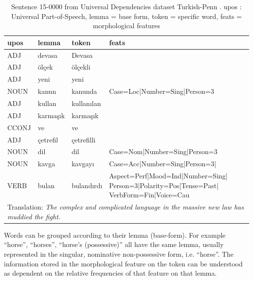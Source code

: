 \documentclass[USenglish]{article}
\begin{document}
\begin{table}[h]
    \centering
    \caption{Sentence 15-0000 from Universal Dependencies dataset Turkish-Penn \citep{kuzgun_2020_UD_turkish_penn}. upos : Universal Part-of-Speech, lemma = base form, token = specific word, feats = morphological features} %
    \label{tab:turkish_example}   
    \begin{tabular}{p{1.5cm}p{2cm}p{2cm}p{6cm}}
\toprule
	\textbf{upos}	&	\textbf{lemma}	&	\textbf{token}	&	\textbf{feats}	\\
    \midrule
	ADJ	&	devasa	&	Devasa	&	\\    \midrule
	ADJ	&	ölçek	&	ölçekli	&\\    \midrule
ADJ	&	yeni	&	yeni	&		\\    \midrule
	NOUN	&	kanun	&	kanunda	&	Case=Loc|Number=Sing|Person=3	\\    \midrule
	ADJ	&	kullan	&	kullanılan	&		\\    \midrule
ADJ	&	karmaşık	&	karmaşık	&\\    \midrule
CCONJ	&	ve	&	ve	&		\\    \midrule
ADJ	&	çetrefil	&	çetrefilli	&		\\    \midrule
	NOUN	&	dil	&	dil	&	Case=Nom|Number=Sing|Person=3	\\    \midrule
	NOUN	&	kavga	&	kavgayı	&	Case=Acc|Number=Sing|Person=3|	\\    \midrule
	VERB	&	bulan	&	bulandırdı	&	Aspect=Perf|Mood=Ind|Number=Sing| Person=3|Polarity=Pos|Tense=Past| VerbForm=Fin|Voice=Cau	\\\midrule
   \multicolumn{4}{p{11cm}}{Translation: \textit{The complex and complicated language in the massive new law has muddied the fight.}}\\    \bottomrule


    \end{tabular}
\end{table}

Words can be grouped according to their lemma (base-form). 
For example ``horse'', ``horses'', ``horse's (possessive)'' all have the same lemma, usually represented in the singular, nominative non-possessive form, i.e. ``horse''.
The information stored in the morphological feature on the token can be understood as dependent on the relative frequencies of that feature on that lemma. 
\end{document}
